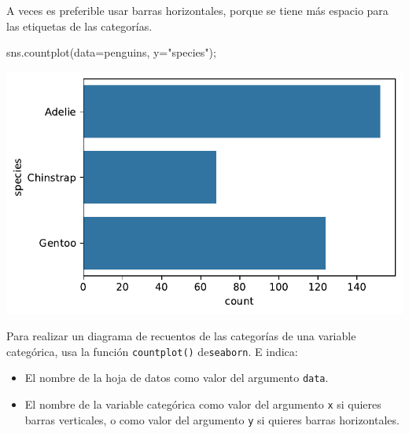 \documentclass[
  a4paper,
  noprof,
  12pt,
  notoc,
  nosols,
  nobib]{mnye}
\newenvironment{Shaded}{\begin{snugshade}}{\end{snugshade}}
\newcommand{\NormalTok}[1]{\textcolor[rgb]{0.00,0.23,0.31}{#1}}
\newcommand{\OperatorTok}[1]{\textcolor[rgb]{0.37,0.37,0.37}{#1}}
\newcommand{\StringTok}[1]{\textcolor[rgb]{0.13,0.47,0.30}{#1}}
\providecommand{\tightlist}{%
  \setlength{\itemsep}{0pt}\setlength{\parskip}{0pt}}\usepackage{longtable,booktabs,array}
\theoremstyle{definition}
\theoremstyle{remark}
\begin{document}
A veces es preferible usar barras horizontales, porque se tiene más
espacio para las etiquetas de las categorías.

\begin{Shaded}
\begin{Highlighting}[]
\NormalTok{sns.countplot(data}\OperatorTok{=}\NormalTok{penguins, y}\OperatorTok{=}\StringTok{"species"}\NormalTok{)}\OperatorTok{;}
\end{Highlighting}
\end{Shaded}

\includegraphics{chapters/1categorical_files/figure-pdf/cell-7-output-1.pdf}

\begin{tcolorbox}[enhanced jigsaw, opacityback=0, leftrule=.75mm, left=2mm, arc=.35mm, rightrule=.15mm, colframe=quarto-callout-note-color-frame, bottomrule=.15mm, colback=white, breakable, toprule=.15mm]
\begin{minipage}[t]{5.5mm}
\textcolor{quarto-callout-note-color}{\faInfo}
\end{minipage}%
\begin{minipage}[t]{\textwidth - 5.5mm}

Para realizar un diagrama de recuentos de las categorías de una variable
categórica, usa la función \texttt{countplot()} de\texttt{seaborn}. E
indica:

\begin{itemize}
\tightlist
\item
  El nombre de la hoja de datos como valor del argumento \texttt{data}.
\item
  El nombre de la variable categórica como valor del argumento
  \texttt{x} si quieres barras verticales, o como valor del argumento
  \texttt{y} si quieres barras horizontales.
\end{itemize}

\end{minipage}%
\end{tcolorbox}
\end{document}

